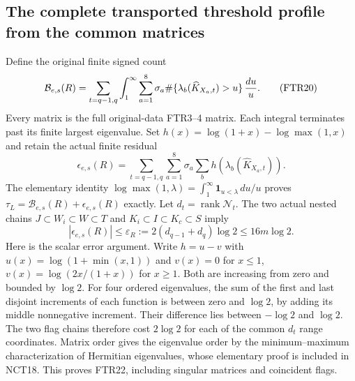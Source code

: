 \documentclass[11pt,a4paper]{article}
\begin{document}
\subsection{The complete transported threshold profile from the common matrices}
Define the original finite signed count
\[
 \mathcal B_{e,s}(R)=\sum_{t=q-1,q}\int_1^\infty
       \sum_{a=1}^8\sigma_a
       \#\{\lambda_b(\widehat K_{X_a,t})>u\}\,{du\over u}.
                                                               \tag{FTR20}
\]
Every matrix is the full original-data FTR3--4 matrix. Each integral
terminates past its finite largest eigenvalue. Set $h(x)=
\log(1+x)-\log\max(1,x)$ and retain the actual finite residual
\[
 \epsilon_{e,s}(R)=\sum_{t=q-1,q}\sum_{a=1}^8\sigma_a
                 \sum_b h(\lambda_b(\widehat K_{X_a,t})).
                                                               \tag{FTR21}
\]
The elementary identity
$\log\max(1,\lambda)=\int_1^\infty\mathbf1_{u<\lambda}\,du/u$
proves $\tau_L=\mathcal B_{e,s}(R)+\epsilon_{e,s}(R)$ exactly.
Let $d_t=\operatorname{rank}\mathscr N_t$. The two actual nested
chains $J\subset W_i\subset W\subset T$ and
$K_i\subset I\subset K_c\subset S$ imply
\[
 |\epsilon_{e,s}(R)|\le
       \varepsilon_R:=2(d_{q-1}+d_q)\log2\le16m\log2.    \tag{FTR22}
\]
Here is the scalar error argument. Write $h=u-v$ with
$u(x)=\log(1+\min(x,1))$ and $v(x)=0$ for $x\le1$,
$v(x)=\log(2x/(1+x))$ for $x\ge1$. Both are increasing
from zero and bounded by $\log2$. For four ordered eigenvalues,
the sum of the first and last disjoint increments of each function
is between zero and $\log2$, by adding its middle nonnegative
increment. Their difference lies between $-\log2$ and $\log2$.
The two flag chains therefore cost $2\log2$ for each of the common
$d_t$ range coordinates. Matrix order gives the eigenvalue order
by the minimum--maximum characterization of Hermitian eigenvalues,
whose elementary proof is included in NCT18. This proves FTR22,
including singular matrices and coincident flags.
\end{document}
